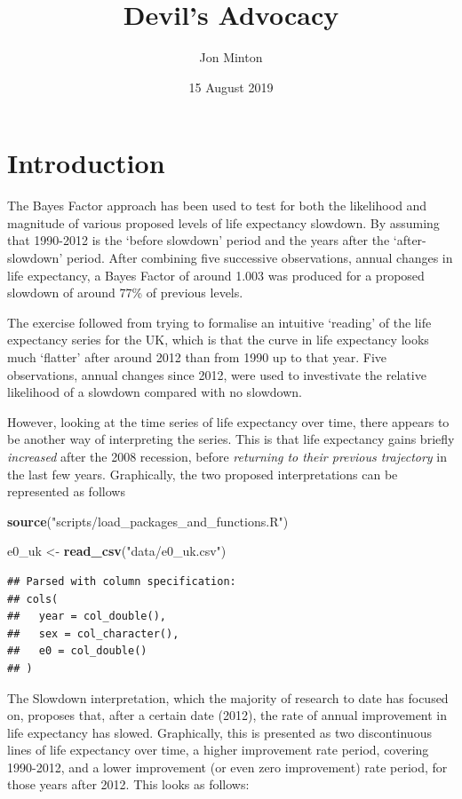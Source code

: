 \documentclass[]{article}
\title{Devil's Advocacy}
\author{Jon Minton}
\date{15 August 2019}
\newenvironment{Shaded}{\begin{snugshade}}{\end{snugshade}}
\newcommand{\KeywordTok}[1]{\textcolor[rgb]{0.13,0.29,0.53}{\textbf{#1}}}
\newcommand{\StringTok}[1]{\textcolor[rgb]{0.31,0.60,0.02}{#1}}
\newcommand{\NormalTok}[1]{#1}
\begin{document}
\maketitle

\section{Introduction}\label{introduction}

The Bayes Factor approach has been used to test for both the likelihood
and magnitude of various proposed levels of life expectancy slowdown. By
assuming that 1990-2012 is the `before slowdown' period and the years
after the `after-slowdown' period. After combining five successive
observations, annual changes in life expectancy, a Bayes Factor of
around 1.003 was produced for a proposed slowdown of around 77\% of
previous levels.

The exercise followed from trying to formalise an intuitive `reading' of
the life expectancy series for the UK, which is that the curve in life
expectancy looks much `flatter' after around 2012 than from 1990 up to
that year. Five observations, annual changes since 2012, were used to
investivate the relative likelihood of a slowdown compared with no
slowdown.

However, looking at the time series of life expectancy over time, there
appears to be another way of interpreting the series. This is that life
expectancy gains briefly \emph{increased} after the 2008 recession,
before \emph{returning to their previous trajectory} in the last few
years. Graphically, the two proposed interpretations can be represented
as follows

\begin{Shaded}
\begin{Highlighting}[]
\KeywordTok{source}\NormalTok{(}\StringTok{"scripts/load_packages_and_functions.R"}\NormalTok{)}

\NormalTok{e0_uk <-}\StringTok{ }\KeywordTok{read_csv}\NormalTok{(}\StringTok{"data/e0_uk.csv"}\NormalTok{)}
\end{Highlighting}
\end{Shaded}

\begin{verbatim}
## Parsed with column specification:
## cols(
##   year = col_double(),
##   sex = col_character(),
##   e0 = col_double()
## )
\end{verbatim}

The Slowdown interpretation, which the majority of research to date has
focused on, proposes that, after a certain date (2012), the rate of
annual improvement in life expectancy has slowed. Graphically, this is
presented as two discontinuous lines of life expectancy over time, a
higher improvement rate period, covering 1990-2012, and a lower
improvement (or even zero improvement) rate period, for those years
after 2012. This looks as follows:
\end{document}
